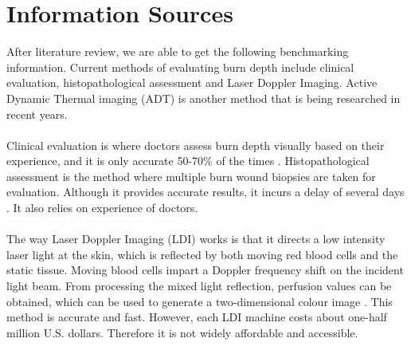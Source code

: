 \documentclass[paper=letter, fontsize=11pt]{scrartcl}
\numberwithin{equation}{section}		%
\numberwithin{figure}{section}			%
\numberwithin{table}{section}			%
\begin{document}
\section{Information Sources}
After literature review, we are able to get the following benchmarking information. Current methods of evaluating burn depth
include clinical evaluation, histopathological assessment and Laser Doppler Imaging. Active Dynamic Thermal imaging (ADT) is
another method that is being researched in recent years.\\
\\
Clinical evaluation is where doctors
assess burn depth visually based on their experience, and it is only accurate 50-70\% of the times \cite{Renkielska}.
Histopathological assessment is the method where multiple burn wound biopsies are taken for evaluation. Although it provides
accurate results, it incurs a delay of several days \cite{Renkielska}. It also relies on experience of doctors.\\
\\
The way Laser Doppler Imaging (LDI) works is that it directs a low intensity laser light at the skin, 
which is reflected by both moving red blood cells and the static tissue. Moving blood cells impart a Doppler frequency shift 
on the incident light beam. From processing the mixed light reflection, perfusion values can be obtained, which can be used 
to generate a two-dimensional colour image \cite{Pape}. This method is accurate and fast. 
However, each LDI machine costs about one-half million U.S. dollars. Therefore it is not widely affordable and accessible.
\end{document}
